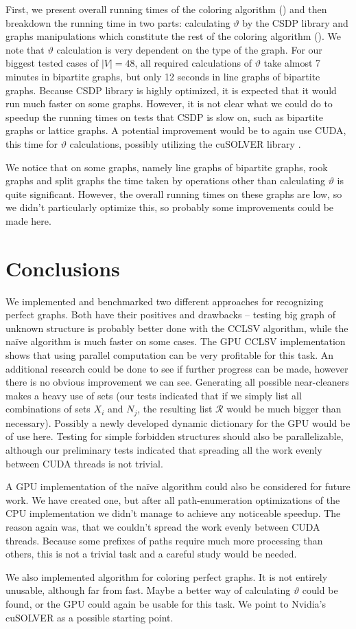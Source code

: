 First, we present overall running times of the coloring algorithm () and then breakdown the running time in two parts: calculating $\vartheta$ by the CSDP library and graphs manipulations which constitute the rest of the coloring algorithm (). We note that $\vartheta$ calculation is very dependent on the type of the graph. For our biggest tested cases of $|V| = 48$, all required calculations of $\vartheta$ take almost 7 minutes in bipartite graphs, but only 12 seconds in line graphs of bipartite graphs. Because CSDP library is highly optimized, it is expected that it would run much faster on some graphs. However, it is not clear what we could do to speedup the running times on tests that CSDP is slow on, such as bipartite graphs or lattice graphs. A potential improvement would be to again use CUDA, this time for $\vartheta$ calculations, possibly utilizing the cuSOLVER library \cite{cusolver}.


We notice that on some graphs, namely line graphs of bipartite graphs, rook graphs and split graphs the time taken by operations other than calculating $\vartheta$ is quite significant. However, the overall running times on these graphs are low, so we didn't particularly optimize this, so probably some improvements could be made here.

\section{Conclusions}
We implemented and benchmarked two different approaches for recognizing perfect graphs. Both have their positives and drawbacks -- testing big graph of unknown structure is probably better done with the CCLSV algorithm, while the na\"ive algorithm is much faster on some cases. The GPU CCLSV implementation shows that using parallel computation can be very profitable for this task. An additional research could be done to see if further progress can be made, however there is no obvious improvement we can see. Generating all possible near-cleaners makes a heavy use of sets (our tests indicated that if we simply list all combinations of sets $X_i$ and $N_j$, the resulting list $\mathcal{R}$ would be much bigger than necessary). Possibly a newly developed dynamic dictionary for the GPU \cite{Ashkiani2018} would be of use here. Testing for simple forbidden structures should also be parallelizable, although our preliminary tests indicated that spreading all the work evenly between CUDA threads is not trivial.

A GPU implementation of the na\"ive algorithm could also be considered for future work. We have created one, but after all path-enumeration optimizations of the CPU implementation we didn't manage to achieve any noticeable speedup. The reason again was, that we couldn't spread the work evenly between CUDA threads. Because some prefixes of paths require much more processing than others, this is not a trivial task and a careful study would be needed.

We also implemented algorithm for coloring perfect graphs. It is not entirely unusable, although far from fast. Maybe a better way of calculating $\vartheta$ could be found, or the GPU could again be usable for this task. We point to Nvidia's cuSOLVER  \cite{cusolver} as a possible starting point.